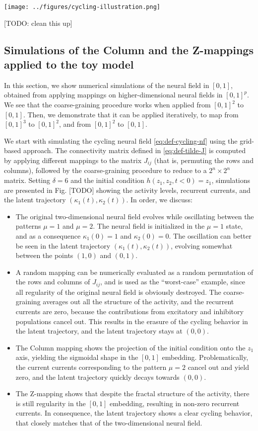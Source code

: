 \documentclass[10pt,letterpaper]{article}
\begin{document}
\texttt{[image: ../figures/cycling-illustration.png]}

[TODO: clean this up]
\endif

\subsection{Simulations of the Column and the Z-mappings applied to the toy model}

In this section, we show numerical simulations of the neural field in $[0,1]$, obtained from applying mappings on higher-dimensional neural fields in $[0,1]^p$. We see that the coarse-graining procedure works when applied from $[0,1]^2$ to $[0,1]$. Then, we demonstrate that it can be applied iteratively, to map from $[0,1]^3$ to $[0,1]^2$, and from $[0,1]^2$ to $[0,1]$.

We start with simulating the cycling neural field \autoref{eq:def-cycling-nf} using the grid-based approach. The connectivity matrix defined in \autoref{eq:def-tilde-J} is computed by applying different mappings to the matrix $J_{ij}$ (that is, permuting the rows and columns), followed by the coarse-graining procedure to reduce to a $2^n \times 2^n$ matrix. Setting $\delta=6$ and the initial condition $h(z_1, z_2, t < 0) = z_1$, simulations are presented in Fig. [TODO] showing the activity levels, recurrent currents, and the latent trajectory $(\kappa_1(t), \kappa_2(t))$. In order, we discuss:
\begin{itemize}
\item The original two-dimensional neural field evolves while oscillating between the patterns $\mu=1$ and $\mu=2$. The neural field is initialized in the $\mu=1$ state, and as a consequence $\kappa_1(0)=1$ and $\kappa_2(0)=0$. The oscillation can better be seen in the latent trajectory $(\kappa_1(t), \kappa_2(t))$, evolving somewhat between the points $(1,0)$ and $(0,1)$.
\item A random mapping can be numerically evaluated as a random permutation of the rows and columns of $J_{ij}$, and is used as the ``worst-case'' example, since all regularity of the original neural field is obviously destroyed. The coarse-graining averages out all the structure of the activity, and the recurrent currents are zero, because the contributions from excitatory and inhibitory populations cancel out. This results in the erasure of the cycling behavior in the latent trajectory, and the latent trajectory stays at $(0,0)$.
\item The Column mapping shows the projection of the initial condition onto the $z_1$ axis, yielding the sigmoidal shape in the $[0,1]$ embedding. Problematically, the current currents corresponding to the pattern $\mu=2$ cancel out and yield zero, and the latent trajectory quickly decays towards $(0,0)$.
\item The Z-mapping shows that despite the fractal structure of the activity, there is still regularity in the $[0,1]$ embedding, resulting in non-zero recurrent currents. In consequence, the latent trajectory shows a clear cycling behavior, that closely matches that of the two-dimensional neural field.
\end{itemize}
\end{document}
